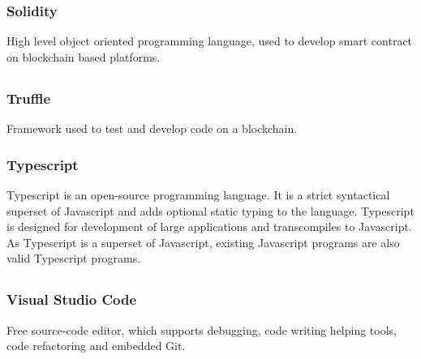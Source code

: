 		\subsubsection*{Solidity}
			High level object oriented programming language, used to develop smart contract on blockchain based platforms.
		
	\subsection*{}
		\subsubsection*{Truffle}
			Framework used to test and develop code on a blockchain.
		\subsubsection*{Typescript}
			Typescript is an open-source programming language. It is a strict syntactical superset of Javascript and adds optional static typing to the language. Typescript is designed for development of large applications and transcompiles to Javascript. As Typescript is a superset of Javascript, existing Javascript programs are also valid Typescript programs.
			
	\subsection*{}
		\subsubsection*{Visual Studio Code}
			Free source-code editor, which supports debugging, code writing helping tools, code refactoring and embedded Git.
	